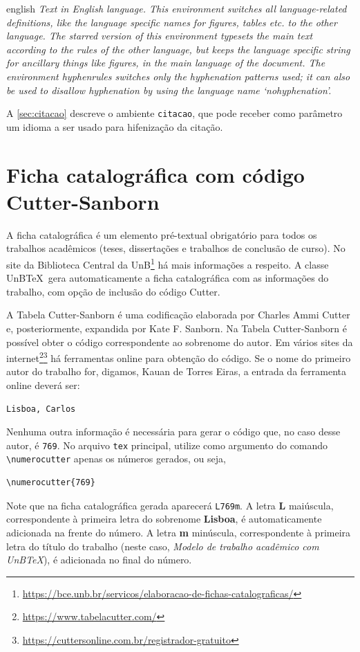 \begin{otherlanguage*}{english}
\textit{Text in English language. This environment switches all language-related definitions, like the language specific names for figures, tables etc. to the other language. The starred version of this environment typesets the main text according to the rules of the other language, but keeps the language specific string for ancillary things like figures, in the main language of the document. The environment hyphenrules switches only the hyphenation patterns used; it can also be used to disallow hyphenation by using the language name `nohyphenation'.}
\end{otherlanguage*}

A \cref{sec:citacao} descreve o ambiente \texttt{citacao}, que pode receber como parâmetro um idioma a ser usado para hifenização da citação.

\section{Ficha catalográfica com código Cutter-Sanborn}

A ficha catalográfica é um elemento pré-textual obrigatório para todos os trabalhos acadêmicos (teses, dissertações e trabalhos de conclusão de curso). No site da Biblioteca Central da UnB\footnote{\url{https://bce.unb.br/servicos/elaboracao-de-fichas-catalograficas/}} há mais informações a respeito. A classe UnB\TeX\ gera automaticamente a ficha catalográfica com as informações do trabalho, com opção de inclusão do código Cutter.

A Tabela Cutter-Sanborn é uma codificação elaborada por Charles Ammi Cutter e, posteriormente, expandida por Kate F. Sanborn. Na Tabela Cutter-Sanborn é possível obter o código correspondente ao sobrenome do autor. Em vários sites da internet\footnote{\url{https://www.tabelacutter.com/}}\footnote{\url{https://cuttersonline.com.br/registrador-gratuito}} há ferramentas online para obtenção do código. Se o nome do primeiro autor do trabalho for, digamos, Kauan de Torres Eiras, a entrada da ferramenta online deverá ser: 
\begin{verbatim}
Lisboa, Carlos
\end{verbatim}
Nenhuma outra informação é necessária para gerar o código que, no caso desse autor, é \texttt{769}. No arquivo \texttt{tex} principal, utilize como argumento do comando \verb|\numerocutter| apenas os números gerados, ou seja,
\begin{verbatim}
\numerocutter{769}
\end{verbatim}
Note que na ficha catalográfica gerada aparecerá \texttt{L769m}. A letra \textbf{L} maiúscula, correspondente à primeira letra do sobrenome \textbf{Lisboa}, é automaticamente adicionada na frente do número. A letra \textbf{m} minúscula, correspondente à primeira letra do título do trabalho (neste caso, \emph{Modelo de trabalho acadêmico com UnB\TeX}), é adicionada no final do número.

